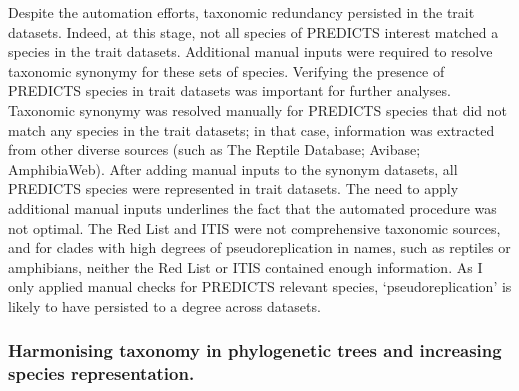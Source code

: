 Despite the automation efforts, taxonomic redundancy persisted in the trait datasets. Indeed, at this stage, not all species of PREDICTS interest matched a species in the trait datasets. Additional manual inputs were required to resolve taxonomic synonymy for these sets of species. Verifying the presence of PREDICTS species in trait datasets was important for further analyses. Taxonomic synonymy was resolved manually for PREDICTS species that did not match any species in the trait datasets; in that case, information was extracted from other diverse sources (such as The Reptile Database; Avibase; AmphibiaWeb). After adding manual inputs to the synonym datasets, all PREDICTS species were represented in trait datasets. The need to apply additional manual inputs underlines the fact that the automated procedure was not optimal. The Red List and ITIS were not comprehensive taxonomic sources, and for clades with high degrees of pseudoreplication in names, such as reptiles or amphibians, neither the Red List or ITIS contained enough information. As I only applied manual checks for PREDICTS relevant species, `pseudoreplication' is likely to have persisted to a degree across datasets. 


\subsubsection{Harmonising taxonomy in phylogenetic trees and increasing species representation.}

